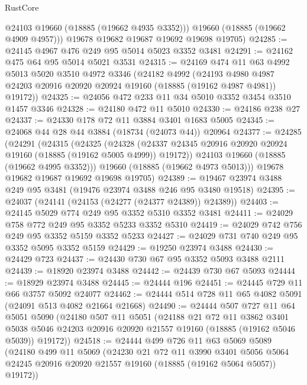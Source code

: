 \begin{lexlean}{RustCore}
\begin{coremodule}
          @24103
          @19660
          (@18885 (@19662 @4935 @3352)))
        @19660
        (@18885 (@19662 @4909 @4957)))
      @19678
      @19682
      @19687
      @19692
      @19698
      @19705)
@24285 := @24145 @4967 @476 @249 @95 @5014 @5023 @3352 @3481
@24291 := @24162 @475 @64 @95 @5014 @5021 @3531
@24315 := @24169
    @474
    @11
    @63
    @4992
    @5013
    @5020
    @3510
    @4972
    @3346
    (@24182
      @4992
      (@24193 @4980 @4987 @24203 @20916 @20920 @20924 @19160 (@18885 (@19162 @4987 @4981)) @19172))
@24325 := @24056 @472 @233 @11 @34 @5010 @3352 @3454 @3510 @1457 @3346
@24328 := @24180 @472 @11 @5010
@24330 := @24186 @238 @27
@24337 := @24330 @178 @72 @11 @3884 @3401 @1683 @5005
@24345 := @24068 @44 @28 @44 @3884 (@18734 (@24073 @44)) @20964
@24377 := @24285
    (@24291
      (@24315
        (@24325
          (@24328 (@24337 @24345 @20916 @20920 @20924 @19160 (@18885 (@19162 @5005 @4999)) @19172))
          @24103
          @19660
          (@18885 (@19662 @4995 @3352)))
        @19660
        (@18885 (@19662 @4973 @5013)))
      @19678
      @19682
      @19687
      @19692
      @19698
      @19705)
@24389 := @19467 @23974 @3488 @249 @95 @3481 (@19476 @23974 @3488 @246 @95 @3480 @19518)
@24395 := @24037 (@24141 (@24153 (@24277 (@24377 @24389)) @24389))
@24403 := @24145 @5029 @774 @249 @95 @3352 @5310 @3352 @3481
@24411 := @24029 @758 @772 @249 @95 @3352 @5233 @3352 @5310
@24419 := @24029 @742 @756 @249 @95 @3352 @5159 @3352 @5233
@24427 := @24029 @731 @740 @249 @95 @3352 @5095 @3352 @5159
@24429 := @19250 @23974 @3488
@24430 := @24429 @723
@24437 := @24430 @730 @67 @95 @3352 @5093 @3488 @2111
@24439 := @18920 @23974 @3488
@24442 := @24439 @730 @67 @5093
@24444 := @18929 @23974 @3488
@24445 := @24444 @196
@24451 := @24445 @729 @11 @66 @3757 @5092 @24077
@24462 := @24444 @514 @728 @11 @65 @4082 @5091 (@24091 @513 @4082 @21664 @21668)
@24490 := @24444
    @507
    @727
    @11
    @64
    @5051
    @5090
    (@24180
      @507
      @11
      @5051
      (@24188
        @21
        @72
        @11
        @3862
        @3401
        @5038
        @5046
        @24203
        @20916
        @20920
        @21557
        @19160
        (@18885 (@19162 @5046 @5039))
        @19172))
@24518 := @24444
    @499
    @726
    @11
    @63
    @5069
    @5089
    (@24180
      @499
      @11
      @5069
      (@24230
        @21
        @72
        @11
        @3990
        @3401
        @5056
        @5064
        @24245
        @20916
        @20920
        @21557
        @19160
        (@18885 (@19162 @5064 @5057))
        @19172))

\end{coremodule}
\end{lexlean}
